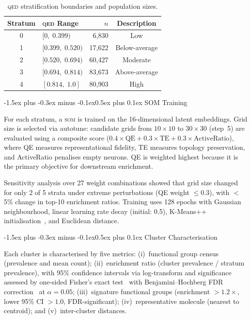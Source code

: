\documentclass[10pt,a4paper,twocolumn]{article}
\makeatletter
\providecommand{\qed}{}
\let\qed\relax
\newcommand{\som}{\textsc{som}}
\newcommand{\qedscore}{\textsc{qed}}
\let\qed\qedscore
\renewcommand\subsubsection{\@startsection{subsubsection}{3}{\z@}%
  {-1.5ex plus -0.3ex minus -0.1ex}{0.5ex plus 0.1ex}%
  {\normalfont\normalsize\bfseries}}
\makeatother
\begin{document}
\begin{table}[tbp]
\centering
\caption{\qed{} stratification boundaries and population sizes.}
\label{tab:strata}
\footnotesize
\begin{tabular}{@{}cl@{\quad}r@{\quad}c@{}}
\toprule
\textbf{Stratum} & \textbf{\qed{} Range} & \textbf{$n$} & \textbf{Description} \\
\midrule
0 & $[0,\; 0.399)$ & 6,830 & Low \\
1 & $[0.399,\; 0.520)$ & 17,622 & Below-average \\
2 & $[0.520,\; 0.694)$ & 60,427 & Moderate \\
3 & $[0.694,\; 0.814)$ & 83,673 & Above-average \\
4 & $[0.814,\; 1.0]$ & 80,903 & High \\
\bottomrule
\end{tabular}
\end{table}

\subsubsection{SOM Training}

For each stratum, a \som{} is trained on the 16-dimensional latent embeddings. Grid size is selected via autotune: candidate grids from $10\times10$ to $30\times30$ (step~5) are evaluated using a composite score ($0.4 \times \text{QE} + 0.3 \times \text{TE} + 0.3 \times \text{ActiveRatio}$), where QE measures representational fidelity, TE measures topology preservation, and ActiveRatio penalises empty neurons. QE is weighted highest because it is the primary objective for downstream enrichment.

Sensitivity analysis over 27 weight combinations showed that grid size changed for only 2 of 5 strata under extreme perturbations (QE weight $\leq 0.3$), with $<$5\% change in top-10 enrichment ratios. Training uses 128 epochs with Gaussian neighbourhood, linear learning rate decay (initial: 0.5), K-Means++ initialisation~\cite{bahmani2012}, and Euclidean distance.

\subsubsection{Cluster Characterisation}

Each cluster is characterised by five metrics: (i)~functional group census (prevalence and mean count); (ii)~enrichment ratio (cluster prevalence / stratum prevalence), with 95\% confidence intervals via log-transform and significance assessed by one-sided Fisher's exact test~\cite{fisher1922} with Benjamini--Hochberg FDR correction~\cite{benjamini1995} at $\alpha = 0.05$; (iii)~signature functional groups (enrichment $> 1.2\times$, lower 95\% CI $> 1.0$, FDR-significant); (iv)~representative molecule (nearest to centroid); and (v)~inter-cluster distances.
\end{document}
